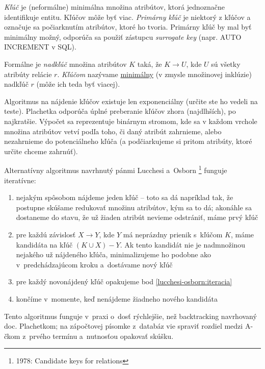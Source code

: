 \documentclass[10pt,a4paper]{article}
\begin{document}
\emph{Kľúč} je (neformálne) minimálna množina atribútov, ktorá
jednoznačne identifikuje entitu. Kľúčov môže byť viac. \emph{Primárny
kľúč} je niektorý z kľúčov a označuje sa počiarknutím atribútov,
ktoré ho tvoria. Primárny kľúč by mal byť minimálny možný, odporúča sa použiť zástupcu \emph{surrogate key} (napr. AUTO INCREMENT v SQL). 

Formálne je \emph{nadkľúč} množina atribútov $K$ taká, že $K \rightarrow U$, kde $U$ sú všetky atribúty relácie $r$. \emph{Kľúčom} nazývame \underline{minimálny} (v zmysle množinovej inklúzie) nadkľúč $r$ (môže ich teda byť viacej).

Algoritmus na nájdenie kľúčov existuje len exponenciálny (určite ste ho vedeli na teste). Plachetka odporúča úplné preberanie kľúčov zhora (najdlhších), po najkratšie. Výpočet sa reprezentuje binárnym stromom, kde sa v každom vrchole množina atribútov vetví podľa toho, či  daný atribút zahrnieme, alebo nezahrnieme do potenciálneho kľúča (a podčiarkujeme si pritom atribúty, ktoré určite chceme zahrnúť). 

Alternatívny algoritmus navrhnutý pánmi Lucchesi a~Osborn \footnote{1978:
Candidate keys for relations} funguje iteratívne:
\begin{enumerate}
    \item
    nejakým spôsobom nájdeme jeden kľúč -- toto sa dá napríklad tak, že
    postupne skúšame redukovať množinu atribútov, kým sa to dá; akonáhle
    sa dostaneme do stavu, že už žiaden atribút nevieme odstrániť, máme
    prvý kľúč

    \item \label{lucchesi-osborn:iteracia}
    pre každú závislosť $X \to Y$, kde $Y$ má neprázdny prienik s~kľúčom
    $K$, máme kandidáta na kľúč $(K \cup X) - Y$. Ak tento kandidát nie je
    nadmnožinou nejakého už nájdeného kľúča, minimalizujeme ho podobne ako
    v~predchádzajúcom kroku a~dostávame nový kľúč

    \item
    pre každý novonájdený kľúč opakujeme bod
    \ref{lucchesi-osborn:iteracia}

    \item
    končíme v~momente, keď nenájdeme žiadneho nového kandidáta
\end{enumerate}

Tento algoritmus funguje v~praxi o~dosť rýchlejšie, než backtracking
navrhovaný doc. Plachetkom; na zápočtovej písomke z~databáz vie spraviť
rozdiel medzi A-čkom z~prvého termínu a~nutnosťou opakovať skúšku.
\end{document}
